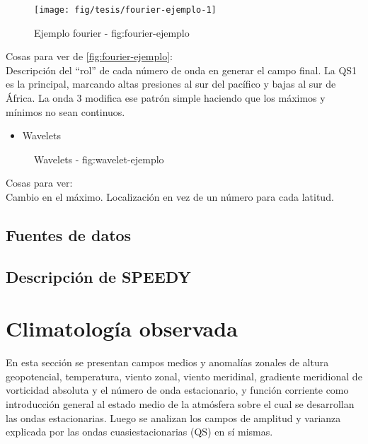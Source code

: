 \documentclass[spanish,a4paper]{book}
\providecommand{\tightlist}{%
  \setlength{\itemsep}{0pt}\setlength{\parskip}{0pt}}
\begin{document}
\begin{figure*}
\texttt{[image: fig/tesis/fourier-ejemplo-1]} \caption{Ejemplo fourier - fig:fourier-ejemplo}\label{fig:fourier-ejemplo}
\end{figure*}

Cosas para ver de \autoref{fig:fourier-ejemplo}:\\
Descripción del ``rol'' de cada número de onda en generar el campo
final. La QS1 es la principal, marcando altas presiones al sur del
pacífico y bajas al sur de África. La onda 3 modifica ese patrón simple
haciendo que los máximos y mínimos no sean continuos.

\begin{itemize}
\tightlist
\item
  Wavelets
\end{itemize}

\begin{figure*}
\caption{Wavelets - fig:wavelet-ejemplo}\label{fig:wavelet-ejemplo}
\end{figure*}

Cosas para ver:\\
Cambio en el máximo. Localización en vez de un número para cada latitud.

\section{Fuentes de datos}\label{fuentes-de-datos}

\section{Descripción de SPEEDY}\label{descripcion-de-speedy}

\chapter{Climatología observada}\label{climatologia-observada}

En esta sección se presentan campos medios y anomalías zonales de altura
geopotencial, temperatura, viento zonal, viento meridinal, gradiente
meridional de vorticidad absoluta y el número de onda estacionario, y
función corriente como introducción general al estado medio de la
atmósfera sobre el cual se desarrollan las ondas estacionarias. Luego se
analizan los campos de amplitud y varianza explicada por las ondas
cuasiestacionarias (QS) en sí mismas.
\end{document}
